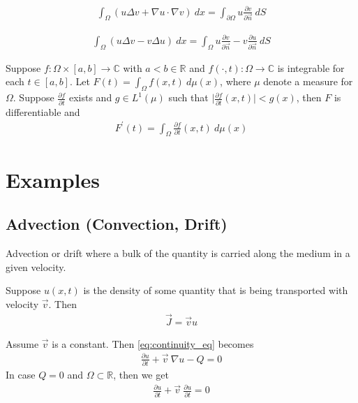 \begin{theorem}
  \begin{align*}
    \int_{\Omega}(u \Delta v + \nabla u \cdot \nabla v) \ d x =
    \int_{\partial \Omega}   u \frac{\partial v}{\partial \vec{n}} \ dS
  \end{align*}
\end{theorem}

\begin{theorem}
  \begin{align*}
    \int_{\Omega}(u \Delta v - v \Delta u) \ d x = \int_{\Omega}   u
    \frac{\partial v}{\partial \vec{n}} - v \frac{\partial
    u}{\partial \vec{n}} \ dS
  \end{align*}
\end{theorem}

\begin{remark}

\end{remark}

\begin{theorem}
  Suppose $f : \Omega \times [a, b] \to  \mathbb{C}$ with $a < b \in
  \mathbb{R}$ and $f(\cdot, t): \Omega \to \mathbb{C}$ is integrable
  for each $t \in [a, b]$. Let $F(t) = \int_\Omega  f(x, t) \ d
  \mu(x)$, where $\mu$ denote a measure for $\Omega$. Suppose
  $\frac{\partial f}{\partial t}$ exists and $g \in L^{1}(\mu)$ such
  that $\Big|\frac{\partial f}{\partial t} (x, t)\Big| < g(x)$, then
  $F$ is differentiable and
  \begin{align*}
    F^\prime(t) = \int_\Omega  \frac{\partial f}{\partial t}(x, t) \ d \mu(x)
  \end{align*}
\end{theorem}

\section{Examples}

\subsection{Advection (Convection, Drift)}

Advection or drift where a bulk of the quantity is carried along the
medium in a given velocity.

Suppose $u(x, t)$ is the density of some quantity that is being
transported with velocity $\vec{v}$. Then
\begin{align*}
  \vec{J} = \vec{v} u
\end{align*}
\begin{example}
  Assume $\vec{v}$ is a constant. Then  \autoref{eq:continuity_eq} becomes
  \begin{align*}
    \frac{\partial u}{\partial t} + \vec{v} \ \nabla u  - Q = 0
  \end{align*}
  In case $Q = 0$ and $ \Omega \subset \mathbb{R}$, then we get
  \begin{align*}
    \frac{\partial u}{\partial t} + \vec{v} \ \frac{\partial u}{\partial t} = 0
  \end{align*}
\end{example}
